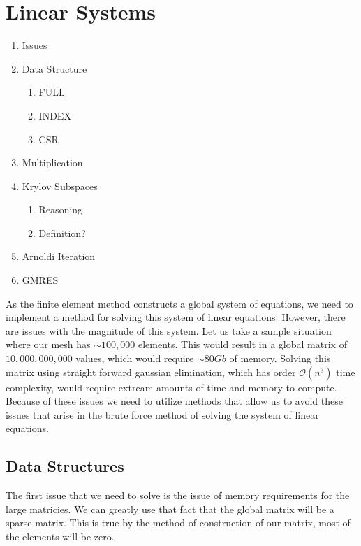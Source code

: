 \documentclass[../fem.tex]{subfiles}
\begin{document}
\section{Linear Systems}%
\label{sec:linear_systems}

\begin{enumerate}
  \item Issues
  \item Data Structure
    \begin{enumerate}
      \item FULL
      \item INDEX
      \item CSR
    \end{enumerate}
  \item Multiplication
  \item Krylov Subspaces
    \begin{enumerate}
      \item Reasoning
      \item Definition?
    \end{enumerate}
  \item Arnoldi Iteration
  \item GMRES
\end{enumerate}

As the finite element method constructs a global system of equations, we need
to implement a method for solving this system of linear equations. However,
there are issues with the magnitude of this system. Let us take a sample
situation where our mesh has $\sim 100,000$ elements. This would result in a
global matrix of $10,000,000,000$ values, which would require $\sim 80Gb$ of
memory. Solving this matrix using straight forward gaussian elimination, which
has order $\mathcal{O}(n^3)$ time complexity, would require extream amounts of
time and memory to compute. Because of these issues we need to utilize methods
that allow us to avoid these issues that arise in the brute force method of
solving the system of linear equations.

\subsection{Data Structures}%
\label{sub:data_structures}

The first issue that we need to solve is the issue of memory requirements for
the large matricies. We can greatly use that fact that the global matrix will
be a sparse matrix. This is true by the method of construction of our matrix,
most of the elements will be zero.
\end{document}
